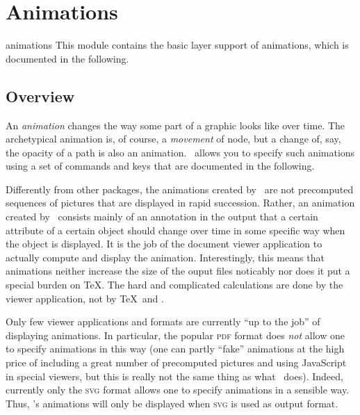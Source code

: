 %
%
%


\section{Animations}

\label{section-base-animations}

\begin{pgfmodule}{animations}
  This module contains the basic layer support of animations, which is
  documented in the following. 
\end{pgfmodule}


\subsection{Overview}

An \emph{animation} changes the way some part of a graphic looks like
over time. The archetypical animation is, of course, a \emph{movement}
of node, but a change of, say, the opacity of a path is also an
animation. \pgfname\ allows you to specify such animations using a set
of commands and keys that are documented in the following.

Differently from other packages, the animations created by \pgfname\ are not
precomputed sequences of pictures that are displayed in rapid
succession. Rather, an animation created by \pgfname\ consists mainly
of an annotation in the output that a certain attribute of a certain
object should change over time in some specific way when the object is
displayed. It is the job of the document viewer application to
actually compute and display the animation. Interestingly, this means
that animations neither increase the size of the ouput files noticably
nor does it put a special burden on \TeX. The hard and complicated
calculations are done by the viewer application, not by \TeX\ and
\pgfname. 

Only few viewer applications and formats are currently ``up to the
job'' of displaying animations.  In particular, 
the popular \textsc{pdf} format does \emph{not} allow one to specify
animations in this way (one can partly ``fake'' animations at the
high price of including a great number of precomputed pictures and
using JavaScript in special viewers, but this is really not the same
thing as what \pgfname\ does). Indeed, currently only the  \textsc{svg}
format allows one to specify animations in a sensible way. Thus,
\pgfname's animations will only be displayed when \textsc{svg} is used
as output format.

